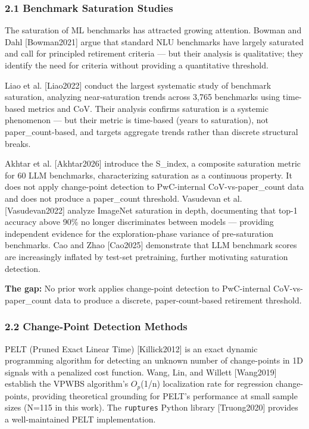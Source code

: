 
\subsubsection{2.1 Benchmark Saturation Studies}

The saturation of ML benchmarks has attracted growing attention. Bowman and Dahl [Bowman2021] argue that standard NLU benchmarks have largely saturated and call for principled retirement criteria --- but their analysis is qualitative; they identify the need for criteria without providing a quantitative threshold.

Liao et al. [Liao2022] conduct the largest systematic study of benchmark saturation, analyzing near-saturation trends across 3,765 benchmarks using time-based metrics and CoV. Their analysis confirms saturation is a systemic phenomenon --- but their metric is time-based (years to saturation), not paper\_count-based, and targets aggregate trends rather than discrete structural breaks.

Akhtar et al. [Akhtar2026] introduce the S\_index, a composite saturation metric for 60 LLM benchmarks, characterizing saturation as a continuous property. It does not apply change-point detection to PwC-internal CoV-vs-paper\_count data and does not produce a paper\_count threshold. Vasudevan et al. [Vasudevan2022] analyze ImageNet saturation in depth, documenting that top-1 accuracy above 90\% no longer discriminates between models --- providing independent evidence for the exploration-phase variance of pre-saturation benchmarks. Cao and Zhao [Cao2025] demonstrate that LLM benchmark scores are increasingly inflated by test-set pretraining, further motivating saturation detection.

\textbf{The gap:} No prior work applies change-point detection to PwC-internal CoV-vs-paper\_count data to produce a discrete, paper-count-based retirement threshold.

\subsubsection{2.2 Change-Point Detection Methods}

PELT (Pruned Exact Linear Time) [Killick2012] is an exact dynamic programming algorithm for detecting an unknown number of change-points in 1D signals with a penalized cost function. Wang, Lin, and Willett [Wang2019] establish the VPWBS algorithm's $O_p$(1/n) localization rate for regression change-points, providing theoretical grounding for PELT's performance at small sample sizes (N=115 in this work). The \texttt{ruptures} Python library [Truong2020] provides a well-maintained PELT implementation.

